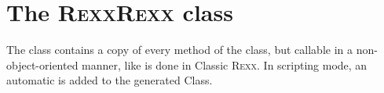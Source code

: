 \section{The R\textsc{exx}R\textsc{exx} class}\label{refrexxrexx}

The  class contains a copy of every method of the  class, but callable in a non-object-oriented manner, like is done in Classic R\textsc{exx}. In scripting mode, an automatic  is added to the generated Class.
